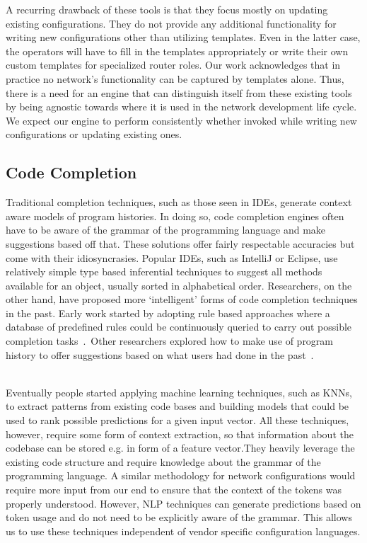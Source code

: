 A recurring drawback of these tools is that they focus mostly on updating existing configurations. They do not provide any additional functionality for writing new configurations other than utilizing templates. Even in the latter case, the operators will have to fill in the templates appropriately or write their own custom templates for specialized router roles. Our work acknowledges that in practice no network’s functionality can be captured by templates alone. Thus, there is a need for an engine that can distinguish itself from these existing tools by being agnostic towards where it is used in the network development life cycle. We expect our engine to perform consistently whether invoked while writing new configurations or updating existing ones.

\subsection{Code Completion}

Traditional completion techniques, such as those seen in IDEs, generate context aware models of program histories. In doing so, code completion engines often have to be aware of the grammar of the programming language and make suggestions based off that. These solutions offer fairly respectable accuracies but come with their idiosyncrasies. Popular IDEs, such as IntelliJ or Eclipse, use relatively simple type based inferential techniques to suggest all methods available for an object, usually sorted in alphabetical order. Researchers, on the other hand, have proposed more ‘intelligent’ forms of code completion techniques in the past. Early work started by adopting rule based approaches where a database of predefined rules could be continuously queried to carry out possible completion tasks~\cite{kaiser}.  Other researchers explored how to make use of program history to offer suggestions based on what users had done in the past~\cite{robbes}.\\  

Eventually people started applying machine learning techniques, such as KNNs, to extract patterns from existing code bases and building models that could be used to rank possible predictions for a given input vector. All these techniques, however, require some form of context extraction, so that information about the codebase can be stored e.g. in form of a feature vector.They heavily leverage the existing code structure and require knowledge about the grammar of the programming language. A similar methodology for network configurations would require more input from our end to ensure that the context of the tokens was properly understood. However, NLP techniques can generate predictions based on token usage and do not need to be explicitly aware of the grammar. This allows us to use these techniques independent of vendor specific configuration languages. 
  